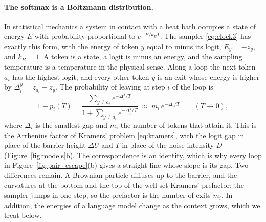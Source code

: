 \paragraph{The softmax is a Boltzmann distribution.} In statistical mechanics a system in contact with a heat bath occupies a state of energy $E$ with probability proportional to $e^{-E/k_BT}$. The sampler \eqref{eq:clock3} has exactly this form, with the energy of token $y$ equal to minus its logit, $E_y=-z_y$, and $k_B=1$. A token is a state, a logit is minus an energy, and the sampling temperature is a temperature in the physical sense. Along a loop the next token $a_i$ has the highest logit, and every other token $y$ is an exit whose energy is higher by $\Delta^y_i=z_{a_i}-z_y$. The probability of leaving at step $i$ of the loop is
\begin{equation}
1-p_i(T)=\frac{\sum_{y\neq a_i}e^{-\Delta_i^y/T}}{1+\sum_{y\neq a_i}e^{-\Delta_i^y/T}}\;\approx\;m_i\,e^{-\Delta_i/T}\qquad (T\to0),
\label{eq:boltz_exit}
\end{equation}
where $\Delta_i$ is the smallest gap and $m_i$ the number of tokens that attain it. This is the Arrhenius factor of Kramers' problem \eqref{eq:kramers}, with the logit gap in place of the barrier height $\Delta U$ and $T$ in place of the noise intensity $D$ (Figure~\ref{fig:models}b). The correspondence is an identity, which is why every loop in Figure~\ref{fig:pair_escape}(b) gives a straight line whose slope is its gap. Two differences remain. A Brownian particle diffuses up to the barrier, and the curvatures at the bottom and the top of the well set Kramers' prefactor; the sampler jumps in one step, so the prefactor is the number of exits $m_i$. In addition, the energies of a language model change as the context grows, which we treat below.

